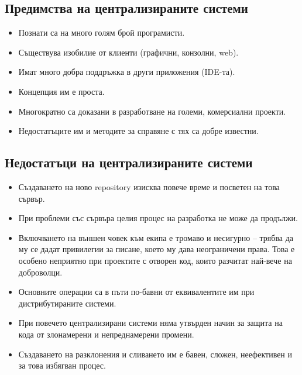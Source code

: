 \documentclass[a4paper]{article}
\begin{document}
  \vspace{5 mm}


  \subsection{Предимства на централизираните системи}
    \begin{itemize}
      \item Познати са на много голям брой програмисти.
      \item Съществува изобилие от клиенти (графични, конзолни, web).
      \item Имат много добра поддръжка в други приложения (IDE-та).
      \item Концепция им е проста.
      \item Многократно са доказани в разработване на големи, комерсиални проекти.
      \item Недостатъците им и методите за справяне с тях са добре известни.
    \end{itemize}

  \subsection{Недостатъци на централизираните системи}
    \begin{itemize}
      \item Създаването на ново repository изисква повече време и посветен на това сървър.
      \item При проблеми със сървъра целия процес на разработка не може да продължи.
      \item Включването на външен човек към екипа е тромаво и несигурно -- трябва да му се дадат привилегии за писане, което му дава неограничени права. Това е особено неприятно при проектите с отворен код, които разчитат най-вече на доброволци.
      \item Основните операции са в пъти по-бавни от еквивалентите им при дистрибутираните системи.
      \item При повечето централизирани системи няма утвърден начин за защита на кода от злонамерени и непреднамерени промени.
      \item Създаването на разклонения и сливането им е бавен, сложен, неефективен и за това избягван процес.
    \end{itemize}
\end{document}
